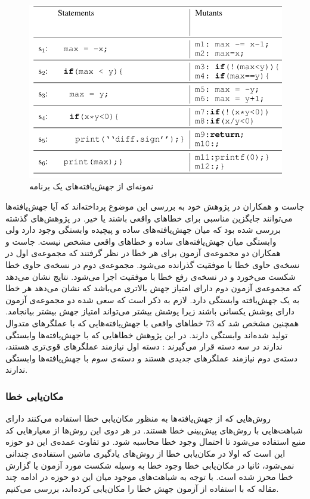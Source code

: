 \begin{figure}[H]
	\centering
	\includegraphics[width=.6\textwidth]{images/mutants.PNG}
	\caption{ نمونه‌ای از جهش‌یافته‌های یک برنامه \cite{moon2014ask}}
	\label{fig:mutant}
\end{figure}
جاست و همکاران در پژوهش خود به بررسی این موضوع پرداخته‌اند که آیا جهش‌یافته‌ها می‌توانند جایگزین مناسبی برای خطاهای واقعی باشند یا خیر\cite{just2014mutants}. در پژوهش‌های گذشته بررسی شده بود که میان جهش‌یافته‌های ساده و پیچیده وابستگی وجود دارد ولی وابستگی میان جهش‌یافته‌های ساده و خطاهای واقعی مشخص نیست. جاست و همکاران دو مجموعه‌ی آزمون برای هر خطا در نظر گرفتند که مجموعه‌ی اول در نسخه‌ی حاوی خطا با موفقیت گذرانده می‌شود. مجموعه‌ی دوم در نسخه‌ی حاوی خطا شکست می‌خورد و در نسخه‌ی رفع خطا با موفقیت اجرا می‌شود. نتایج نشان می‌دهد که مجموعه‌ی آزمون دوم دارای امتیاز جهش بالاتری می‌باشد که نشان می‌دهد هر خطا به یک جهش‌یافته وابستگی دارد. لازم به ذکر است که سعی شده  دو مجموعه‌ی آزمون دارای پوشش یکسانی باشند زیرا پوشش بیشتر می‌تواند امتیاز جهش بیشتر بیانجامد. همچنین مشخص شد که  
73 \lr{\%} 
خطاهای واقعی با جهش‌یافته‌هایی که  با عملگرهای متدوال تولید شده‌اند وابستگی دارند. در این پژوهش خطاهایی که با جهش‌یافته‌ها وابستگی ندارند در سه دسته قرار می‌گیرند : دسته اول نیازمند عملگرهای قوی‌تری هستند، دسته‌ی دوم نیازمند عملگرهای جدیدی هستند و دسته‌ی سوم با جهش‌یافته‌ها وابستگی ندارند.\\
\subsubsection{مکان‌یابی خطا}
روش‌هایی که از جهش‌یافته‌ها به منظور مکان‌یابی خطا استفاده می‌کنند دارای شباهت‌هایی با روش‌های پیش‌بینی خطا هستند. در هر دوی این روش‌ها از معیارهایی  کد منبع استفاده می‌شود تا احتمال وجود خطا محاسبه شود. دو تفاوت عمده‌ی این دو حوزه این است که اولا در مکان‌یابی خطا از روش‌های یادگیری ماشین استفاده‌ی چندانی نمی‌شود، ثانیا در مکان‌یابی خطا وجود خطا به وسیله شکست مورد آزمون یا گزارش خطا محرز شده است. با توجه به شباهت‌های موجود میان این دو حوزه در ادامه چند مقاله که با استفاده از آزمون جهش خطا را مکان‌یابی کرده‌اند، بررسی می‌کنیم. \\

